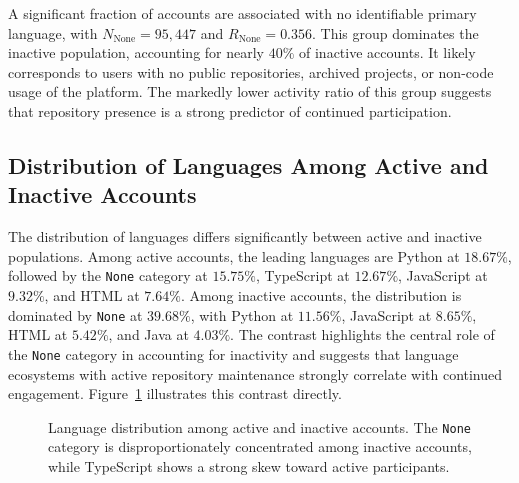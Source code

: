 \documentclass[12pt,a4paper]{article}
\begin{document}
A significant fraction of accounts are associated with no identifiable primary language, with $N_{\text{None}} = 95{,}447$ and $R_{\text{None}} = 0.356$. This group dominates the inactive population, accounting for nearly $40\%$ of inactive accounts. It likely corresponds to users with no public repositories, archived projects, or non-code usage of the platform. The markedly lower activity ratio of this group suggests that repository presence is a strong predictor of continued participation.

\subsection{Distribution of Languages Among Active and Inactive Accounts}

The distribution of languages differs significantly between active and inactive populations. Among active accounts, the leading languages are Python at $18.67\%$, followed by the \texttt{None} category at $15.75\%$, TypeScript at $12.67\%$, JavaScript at $9.32\%$, and HTML at $7.64\%$. Among inactive accounts, the distribution is dominated by \texttt{None} at $39.68\%$, with Python at $11.56\%$, JavaScript at $8.65\%$, HTML at $5.42\%$, and Java at $4.03\%$. The contrast highlights the central role of the \texttt{None} category in accounting for inactivity and suggests that language ecosystems with active repository maintenance strongly correlate with continued engagement. Figure~\ref{fig:composition} illustrates this contrast directly.

\begin{figure}[h]
\centering
{}
\caption{Language distribution among active and inactive accounts. The \texttt{None} category is disproportionately concentrated among inactive accounts, while TypeScript shows a strong skew toward active participants.}
\label{fig:composition}
\end{figure}
\end{document}
